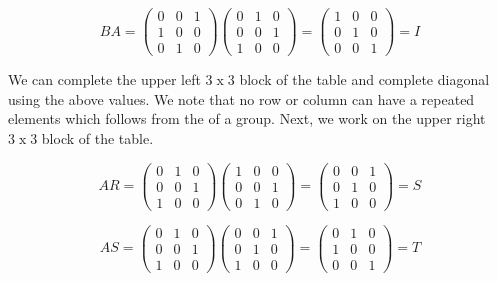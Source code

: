 \documentclass[12pt]{article}
\begin{document}
\begin{displaymath}
BA= \left( \begin{array}{ccc}
0 & 0 & 1 \\
1 & 0 & 0\\
0 & 1 & 0
\end{array} \right )
\left( \begin{array}{ccc}
0 & 1 & 0 \\
0 & 0 & 1\\
1 & 0 & 0
\end{array} \right )=
\left( \begin{array}{ccc}
1 & 0 & 0 \\
0 & 1 & 0\\
0 & 0 & 1
\end{array} \right )=I
\end{displaymath}

We can complete the upper left $3\operatorname{x}3$ block of the table and complete diagonal using the above values.  We note that no row or column can have a repeated elements which follows from the  of a group.  Next, we work on the upper right $3\operatorname{x}3$ block of the table.

\begin{displaymath}
AR=\left( \begin{array}{ccc}
0 & 1 & 0 \\
0 & 0 & 1 \\
1 & 0 & 0
\end{array} \right )
\left( \begin{array}{ccc}
1 & 0 & 0 \\
0 & 0 & 1 \\
0 & 1 & 0
\end{array} \right )=
\left( \begin{array}{ccc}
0 & 0 & 1 \\
0 & 1 & 0 \\
1 & 0 & 0
\end{array} \right )=S
\end{displaymath}

\begin{displaymath}
AS=\left( \begin{array}{ccc}
0 & 1 & 0 \\
0 & 0 & 1 \\
1 & 0 & 0
\end{array} \right )
\left( \begin{array}{ccc}
0 & 0 & 1 \\
0 & 1 & 0 \\
1 & 0 & 0
\end{array} \right )=
\left( \begin{array}{ccc}
0 & 1 & 0 \\
1 & 0 & 0 \\
0 & 0 & 1
\end{array} \right )=T
\end{displaymath}
\end{document}
